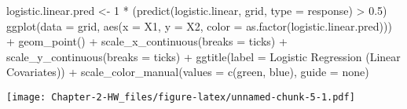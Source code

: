 \documentclass[
]{article}
\newenvironment{Shaded}{\begin{snugshade}}{\end{snugshade}}
\newcommand{\AttributeTok}[1]{\textcolor[rgb]{0.77,0.63,0.00}{#1}}
\newcommand{\DecValTok}[1]{\textcolor[rgb]{0.00,0.00,0.81}{#1}}
\newcommand{\FloatTok}[1]{\textcolor[rgb]{0.00,0.00,0.81}{#1}}
\newcommand{\FunctionTok}[1]{\textcolor[rgb]{0.00,0.00,0.00}{#1}}
\newcommand{\NormalTok}[1]{#1}
\newcommand{\OtherTok}[1]{\textcolor[rgb]{0.56,0.35,0.01}{#1}}
\newcommand{\SpecialCharTok}[1]{\textcolor[rgb]{0.00,0.00,0.00}{#1}}
\newcommand{\StringTok}[1]{\textcolor[rgb]{0.31,0.60,0.02}{#1}}
\begin{document}
\begin{Shaded}
\begin{Highlighting}[]
\NormalTok{logistic.linear.pred }\OtherTok{\textless{}{-}} \DecValTok{1} \SpecialCharTok{*}\NormalTok{ (}\FunctionTok{predict}\NormalTok{(logistic.linear, grid, }\AttributeTok{type =} \StringTok{\textquotesingle{}response\textquotesingle{}}\NormalTok{) }\SpecialCharTok{\textgreater{}} \FloatTok{0.5}\NormalTok{)}
\FunctionTok{ggplot}\NormalTok{(}\AttributeTok{data =}\NormalTok{ grid, }\FunctionTok{aes}\NormalTok{(}\AttributeTok{x =}\NormalTok{ X1, }\AttributeTok{y =}\NormalTok{ X2, }\AttributeTok{color =} \FunctionTok{as.factor}\NormalTok{(logistic.linear.pred))) }\SpecialCharTok{+}
  \FunctionTok{geom\_point}\NormalTok{() }\SpecialCharTok{+} 
  \FunctionTok{scale\_x\_continuous}\NormalTok{(}\AttributeTok{breaks =}\NormalTok{ ticks) }\SpecialCharTok{+} 
  \FunctionTok{scale\_y\_continuous}\NormalTok{(}\AttributeTok{breaks =}\NormalTok{ ticks) }\SpecialCharTok{+}
  \FunctionTok{ggtitle}\NormalTok{(}\AttributeTok{label =} \StringTok{\textquotesingle{}Logistic Regression (Linear Covariates)\textquotesingle{}}\NormalTok{) }\SpecialCharTok{+} 
  \FunctionTok{scale\_color\_manual}\NormalTok{(}\AttributeTok{values =} \FunctionTok{c}\NormalTok{(}\StringTok{\textquotesingle{}green\textquotesingle{}}\NormalTok{, }\StringTok{\textquotesingle{}blue\textquotesingle{}}\NormalTok{), }\AttributeTok{guide =} \StringTok{\textquotesingle{}none\textquotesingle{}}\NormalTok{)}
\end{Highlighting}
\end{Shaded}

\texttt{[image: Chapter-2-HW\_files/figure-latex/unnamed-chunk-5-1.pdf]}
\end{document}
